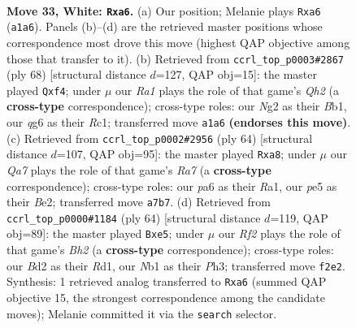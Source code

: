 \documentclass[11pt]{article}
\begin{document}
\clearpage

\begin{figure}[p]\centering
\begin{subfigure}{0.46\textwidth}\centering
\resizebox{\linewidth}{!}{%
\newchessgame
\chessboard[
  setfen={nr4k1/Q4pb1/p5qp/4p3/4P2n/1r3P2/1P1B1RN1/RN4K1 w - - 0 33},
  showmover=false,
  pgfstyle=straightmove, color=movearrow, markmove={a1-a6}
]}
\caption{}
\end{subfigure}\hfill
\begin{subfigure}{0.46\textwidth}\centering
\resizebox{\linewidth}{!}{%
\newchessgame
\chessboard[
  setfen={r3r1k1/5p2/2nB2pP/1q1p4/b1pP1p2/4P3/7Q/1BR1R1K1 w - - 0 35},
  showmover=false,
  pgfstyle=straightmove, color=movearrow, markmove={h2-f4}
]}
\caption{}
\end{subfigure}
\\[4pt]
\begin{subfigure}{0.46\textwidth}\centering
\resizebox{\linewidth}{!}{%
\newchessgame
\chessboard[
  setfen={r2r2k1/Rb3pp1/5n1p/1pP5/3qpQ2/6N1/4BPPP/R5K1 w - - 0 33},
  showmover=false,
  pgfstyle=straightmove, color=movearrow, markmove={a7-a8}
]}
\caption{}
\end{subfigure}\hfill
\begin{subfigure}{0.46\textwidth}\centering
\resizebox{\linewidth}{!}{%
\newchessgame
\chessboard[
  setfen={4r1k1/p1n2rb1/1qN3Qp/1P1pp1p1/8/4Pp1P/5P1B/2RR2K1 w - - 0 33},
  showmover=false,
  pgfstyle=straightmove, color=movearrow, markmove={h2-e5}
]}
\caption{}
\end{subfigure}
\caption{\textbf{Move 33, White: \texttt{Rxa6}.} (a) Our position; Melanie plays \texttt{Rxa6} (\texttt{a1a6}). Panels (b)--(d) are the retrieved master positions whose correspondence most drove this move (highest QAP objective among those that transfer to it). (b) Retrieved from \texttt{ccrl\_top\_p0003\#2867} (ply 68) [structural distance $d$=127, QAP obj=15]: the master played \texttt{Qxf4}; under $\mu$ our \emph{Ra1} plays the role of that game's \emph{Qh2} (a \textbf{cross-type} correspondence); cross-type roles: our \emph{N}g2 as their \emph{B}b1, our \emph{q}g6 as their \emph{R}c1; transferred move \texttt{a1a6} \textbf{(endorses this move)}. (c) Retrieved from \texttt{ccrl\_top\_p0002\#2956} (ply 64) [structural distance $d$=107, QAP obj=95]: the master played \texttt{Rxa8}; under $\mu$ our \emph{Qa7} plays the role of that game's \emph{Ra7} (a \textbf{cross-type} correspondence); cross-type roles: our \emph{p}a6 as their \emph{R}a1, our \emph{p}e5 as their \emph{B}e2; transferred move \texttt{a7b7}. (d) Retrieved from \texttt{ccrl\_top\_p0000\#1184} (ply 64) [structural distance $d$=119, QAP obj=89]: the master played \texttt{Bxe5}; under $\mu$ our \emph{Rf2} plays the role of that game's \emph{Bh2} (a \textbf{cross-type} correspondence); cross-type roles: our \emph{B}d2 as their \emph{R}d1, our \emph{N}b1 as their \emph{P}h3; transferred move \texttt{f2e2}. Synthesis: 1 retrieved analog transferred to \texttt{Rxa6} (summed QAP objective 15, the strongest correspondence among the candidate moves); Melanie committed it via the \texttt{search} selector.}
\label{fig:thought-m64}
\end{figure}
\end{document}
